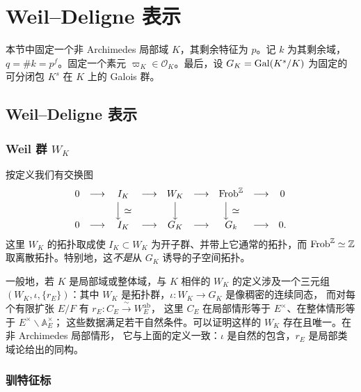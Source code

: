 \section{Weil--Deligne 表示}

本节中固定一个非 Archimedes 局部域 $K$，其剩余特征为 $p$。记 $k$ 为其剩余域，
$q=\#k=p^{f}$。固定一个素元 $\varpi_K\in\mathcal{O}_K$。最后，设
$G_K=\mathrm{Gal}(K^{s}/K)$ 为固定的可分闭包 $K^{s}$ 在 $K$ 上的 Galois 群。

\subsection{Weil--Deligne 表示}

\subsubsection{Weil 群 $W_K$}

按定义我们有交换图
\[
\begin{array}{ccccccccc}
0 & \longrightarrow & I_K & \longrightarrow & W_K & \longrightarrow & \mathrm{Frob}^{\mathbb{Z}} & \longrightarrow & 0\\[2pt]
 & & \Big\downarrow\simeq & & \Big\downarrow & & \Big\downarrow\simeq & & \\[2pt]
0 & \longrightarrow & I_K & \longrightarrow & G_K & \longrightarrow & G_k & \longrightarrow & 0 .
\end{array}
\]
这里 $W_K$ 的拓扑取成使 $I_K\subset W_K$ 为开子群、并带上它通常的拓扑，而
$\mathrm{Frob}^{\mathbb{Z}}\simeq\mathbb{Z}$ 取离散拓扑。特别地，这\emph{不是}从 $G_K$ 诱导的子空间拓扑。

\begin{remark}
一般地，若 $K$ 是局部域或整体域，与 $K$ 相伴的 $W_K$ 的定义涉及一个三元组
$(W_K,\iota,\{r_E\})$：其中 $W_K$ 是拓扑群，$\iota\colon W_K\to G_K$ 是像稠密的连续同态，
而对每个有限扩张 $E/F$ 有 $r_E\colon C_E\xrightarrow{\ \sim\ }W^{\mathrm{ab}}_E$，
这里 $C_E$ 在局部情形等于 $E^{\times}$、在整体情形等于 $E^{\times}\backslash\mathbb{A}^{\times}_E$；
这些数据满足若干自然条件。可以证明这样的 $W_K$ 存在且唯一。在非 Archimedes 局部情形，
它与上面的定义一致：$\iota$ 是自然的包含，$r_E$ 是局部类域论给出的同构。
\end{remark}

\subsubsection{驯特征标}

